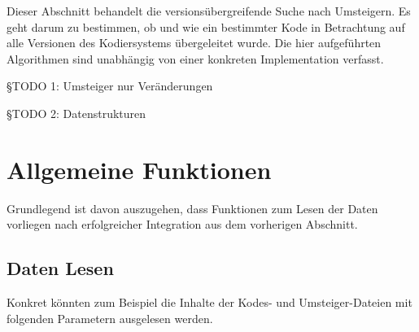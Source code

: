 Dieser Abschnitt behandelt die versionsübergreifende Suche nach Umsteigern.
Es geht darum zu bestimmen, ob und wie ein bestimmter Kode in Betrachtung auf alle Versionen des Kodiersystems übergeleitet wurde. 
Die hier aufgeführten Algorithmen sind unabhängig von einer konkreten Implementation verfasst. 

{\color{blue} §TODO 1: Umsteiger nur Veränderungen}

{\color{blue} §TODO 2: Datenstrukturen}

\section{Allgemeine Funktionen}

Grundlegend ist davon auszugehen, dass Funktionen zum Lesen der Daten vorliegen nach erfolgreicher Integration aus dem vorherigen Abschnitt. 

\subsection{Daten Lesen}
\label{function-read-data}

Konkret könnten zum Beispiel die Inhalte der Kodes- und Umsteiger-Dateien mit folgenden Parametern ausgelesen werden. 


